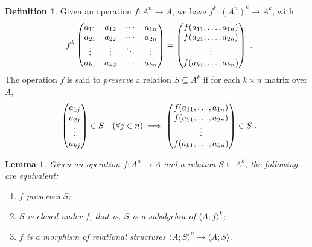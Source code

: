 \documentclass[11pt, a4paper, twoside,leqno]{amsart}
\numberwithin{equation}{section}
\theoremstyle{plain}
\newtheorem{Lemma}[Thm]{Lemma}
\theoremstyle{definition}
\newtheorem{Defn}[Thm]{Definition}
\begin{document}
\begin{Defn}
  \label{def:compatibility-matrix}
  Given an operation \(f \colon A^{n} \rightarrow A\), we have \(f^{k}
  \colon (A^{n})^{k} \rightarrow A^{k}\), with
  \begin{equation*}
    f^{k}
    \begin{pmatrix}
      a_{11} & a_{12} & \cdots & a_{1n} \\
      a_{21} & a_{22} & \cdots & a_{2n} \\
      \vdots  & \vdots  & \ddots & \vdots  \\
      a_{k1} & a_{k2} & \cdots & a_{kn} 
    \end{pmatrix}
    =
    \begin{pmatrix}
      f(a_{11}, \dotsc , a_{1n}) \\
      f(a_{21}, \dotsc , a_{2n}) \\
      \vdots  \\
      f(a_{k1}, \dotsc , a_{kn})
    \end{pmatrix}\rlap{ .}
  \end{equation*}
  The operation \(f\) is said to \emph{preserve}
  a relation \(S \subseteq A^{k}\) if for each \(k\times n\) matrix over \(A\),
  \begin{equation*}
    \begin{pmatrix}
      a_{1j} \\
      a_{2j} \\
      \vdots \\
      a_{kj}
    \end{pmatrix} \in S  \quad (\forall j\in n)
    \implies
    \begin{pmatrix}
      f(a_{11}, \dotsc , a_{1n}) \\
      f(a_{21}, \dotsc , a_{2n}) \\
      \vdots  \\
      f(a_{k1}, \dotsc , a_{kn})
    \end{pmatrix} \in S  \rlap{ .}
  \end{equation*}
\end{Defn}

\begin{Lemma}
  \label{lem:compatibility}
  Given an operation \(f \colon A^{n} \rightarrow A\) and a relation \(S
  \subseteq A^{k}\), the following are equivalent:
  \begin{enumerate}
    [label=(\alph*), ref=(\alph*)]
  \item
    \label{it:preservation-of-rel}
    \(f\) preserves \(S \);
  \item
    \label{it:closed-under-op}
    \(S \) is \emph{closed} under \(f\), that is, \(S\) is a subalgebra of
    \(\langle A; f \rangle^{k}\);
  \item
    \label{it:morphism-rel-str}
    \(f\) is a morphism of relational structures
    \(\langle A; S  \rangle^{n} \rightarrow \langle A; S \rangle\).
  \end{enumerate}
\end{Lemma}
\end{document}
